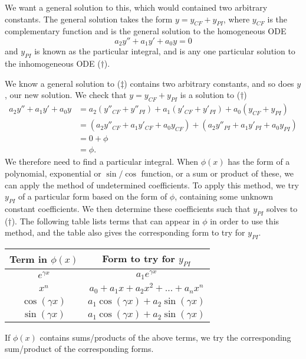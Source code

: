 \documentclass[10pt, a4paper]{article}
\begin{document}
We want a general solution to this,
which would contained two arbitrary constants.
The general solution takes the form $y = y_{CF} + y_{PI}$,
where $y_{CF}$ is the complementary function and is the general solution to the homogeneous ODE
\[
a_2y'' + a_1y' + a_0y = 0
\]
and $y_{PI}$ is known as the particular integral,
and is any one particular solution to the inhomogeneous ODE ($\dagger$).

We know a general solution to ($\ddagger$) contains two arbitrary constants,
and so does $y$,
our new solution.
We check that $y = y_{CF} + y_{PI}$ is a solution to ($\dagger$)
\begin{align*}
    a_2y'' + a_1y' + a_0y &= a_2(y''_{CF} + y''_{PI}) + a_1(y'_{CF} + y'_{PI}) + a_0(y_{CF} + y_{PI}) \\
    &= (a_2y''_{CF} + a_1y'_{CF} + a_0y_{CF}) + (a_2y''_{PI} + a_1y'_{PI} + a_0y_{PI}) \\
    &= 0 + \phi \\
    &= \phi.
\end{align*}
We therefore need to find a particular integral.
When $\phi(x)$ has the form of a polynomial,
exponential or $\sin/\cos$ function,
or a sum or product of these,
we can apply the method of undetermined coefficients.
To apply this method,
we try $y_{PI}$ of a particular form based on the form of $\phi$,
containing some unknown constant coefficients.
We then determine these coefficients such that $y_{PI}$ solves to ($\dagger$).
The following table lists terms that can appear in $\phi$ in order to use this method,
and the table also gives the corresponding form to try for $y_{PI}$.
\begin{table}[H]
    \begin{tabular}{c|c}
         Term in $\phi(x)$ & Form to try for $y_{PI}$ \\
         \hline
         $e ^ {\gamma x}$ & $a_1e ^ {\gamma x}$ \\
         $x ^ n$ & $a_0 + a_1x + a_2x ^ 2 + \dotsc + a_nx ^ n$ \\
         $\cos(\gamma x)$ & $a_1\cos(\gamma x) + a_2\sin(\gamma x)$ \\
         $\sin(\gamma x)$ & $a_1\cos(\gamma x) + a_2\sin(\gamma x)$
    \end{tabular}
\end{table}
If $\phi(x)$ contains sums/products of the above terms,
we try the corresponding sum/product of the corresponding forms.
\end{document}
